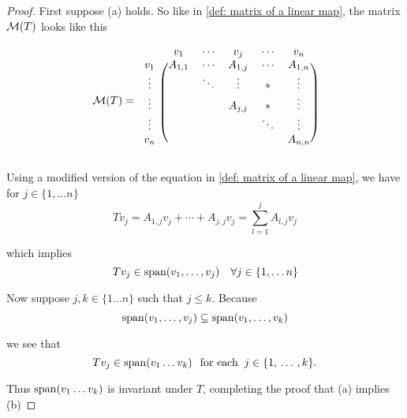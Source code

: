 \begin{proof}
  First suppose (a) holds. So like in \ref{def: matrix of a linear map}, the matrix $\mathcal{M}(T)$ looks like this

  \begin{minipage}{\linewidth}
  \begin{equation}
  \mathcal{M} (T) =
  \begin{blockarray}{cccccc}
    & v_1     & \cdots & v_j      & \cdots & v_n     \\
    \begin{block}{c(ccccc)}
      v_1    & A_{1,1} & \cdots & A_{1,j}  & \cdots & A_{1,n} \\
      \vdots &         & \ddots & \vdots   &   *    & \vdots  \\
      \vdots &         &        & A_{j,j}  &   *    & \vdots  \\
      \vdots &         &        &          & \ddots & \vdots  \\
      v_n    &         &        &          &        & A_{n,n} \\
    \end{block}
  \end{blockarray}
  \end{equation}
  \end{minipage}


  Using a modified version of the equation in \ref{def: matrix of a linear map}, we have for $j\in \{1, \ldots n \}$
  \begin{equation}
    T v_j = A_{1,j} v_j + \cdots + A_{j,j} v_j = \sum_{l=1}^{j} A_{l,j} v_j
  \end{equation}

  which implies
  \begin{equation}
    T v_j \in \operatorname{span} (v_1, \ldots, v_j) \quad \forall j\in \{1, \ldots n \}
  \end{equation}

  Now suppose $j, k \in \{1 \ldots n \}$ such that $j \leq  k.$ Because
  \begin{equation}
    \operatorname{span} (v_1, \ldots, v_j) \subseteq \operatorname{span} (v_1, \ldots, v_k)
  \end{equation}

  we see that
  \begin{equation}
    T v_j \in \operatorname{span} (v_1 \ldots v_k) \;\;\, \text{for each}\;\; j \in \{1, {\, \ldots \,\,}, k\}.
  \end{equation}

  Thus $\operatorname{span} (v_1 \ldots v_k)$ is invariant under $T$, completing the proof that (a) implies (b)


\end{proof}
